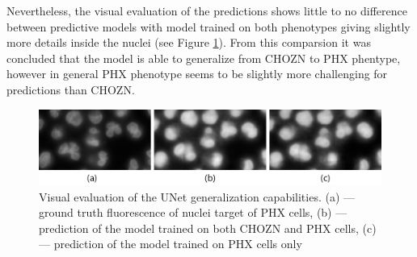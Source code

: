         Nevertheless, the visual evaluation of the predictions shows little to no difference between predictive models with model trained on both phenotypes giving slightly more details inside the nuclei (see Figure \ref{fig:generalizability}). From this comparsion it was concluded that the model is able to generalize from CHOZN to PHX phentype, however in general PHX phenotype seems to be slightly more challenging for predictions than CHOZN. 

        \begin{figure}[htb]
            \begin{center}
                \includegraphics[width=\linewidth]{bilder/stability/generalizability-phenotypes/only-chozn.png}
                \caption[Visual evaluation of the UNet generalization capabilities]%
                {Visual evaluation of the UNet generalization capabilities. (a) --- ground truth fluorescence of nuclei target of PHX cells, (b) --- prediction of the model trained on both CHOZN and PHX cells, (c) --- prediction of the model trained on PHX cells only}\label{fig:generalizability}
            \end{center}
        \end{figure}